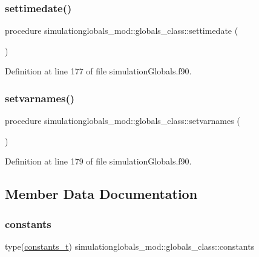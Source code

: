 \subsubsection{\texorpdfstring{settimedate()}{settimedate()}}
{\footnotesize\ttfamily procedure simulationglobals\+\_\+mod\+::globals\+\_\+class\+::settimedate (\begin{DoxyParamCaption}{ }\end{DoxyParamCaption})\hspace{0.3cm}{\ttfamily [private]}}



Definition at line 177 of file simulation\+Globals.\+f90.

\mbox{\label{structsimulationglobals__mod_1_1globals__class_ac9fcf75928fccae1c6ac5c98603ed9b8}} 
\subsubsection{\texorpdfstring{setvarnames()}{setvarnames()}}
{\footnotesize\ttfamily procedure simulationglobals\+\_\+mod\+::globals\+\_\+class\+::setvarnames (\begin{DoxyParamCaption}{ }\end{DoxyParamCaption})\hspace{0.3cm}{\ttfamily [private]}}



Definition at line 179 of file simulation\+Globals.\+f90.



\subsection{Member Data Documentation}
\mbox{\label{structsimulationglobals__mod_1_1globals__class_ae5b1d2a8e662ad25456336893c91dd92}} 
\subsubsection{\texorpdfstring{constants}{constants}}
{\footnotesize\ttfamily type(\mbox{\hyperlink{structsimulationglobals__mod_1_1constants__t}{constants\+\_\+t}}) simulationglobals\+\_\+mod\+::globals\+\_\+class\+::constants\hspace{0.3cm}{\ttfamily [private]}}



